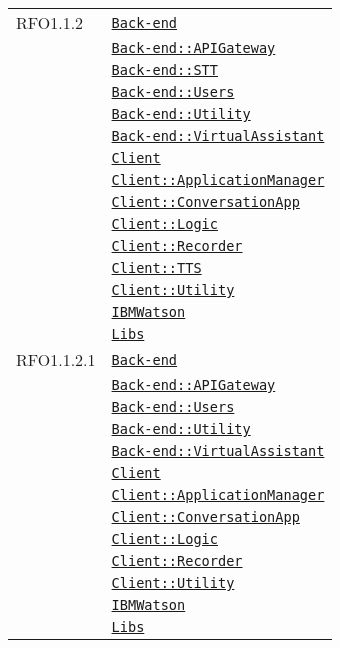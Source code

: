 \begin{longtable}{|>{\centering}m{3cm}|m{10cm}<{\centering}|}
RFO1.1.2 & \hyperref[Back-end]{\texttt{Back-end}}\\
& \hyperref[Back-end::APIGateway]{\texttt{Back-end::APIGateway}}\\
& \hyperref[Back-end::STT]{\texttt{Back-end::STT}}\\
& \hyperref[Back-end::Users]{\texttt{Back-end::Users}}\\
& \hyperref[Back-end::Utility]{\texttt{Back-end::Utility}}\\
& \hyperref[Back-end::VirtualAssistant]{\texttt{Back-end::VirtualAssistant}}\\
& \hyperref[Client]{\texttt{Client}}\\
& \hyperref[Client::ApplicationManager]{\texttt{Client::ApplicationManager}}\\
& \hyperref[Client::ConversationApp]{\texttt{Client::ConversationApp}}\\
& \hyperref[Client::Logic]{\texttt{Client::Logic}}\\
& \hyperref[Client::Recorder]{\texttt{Client::Recorder}}\\
& \hyperref[Client::TTS]{\texttt{Client::TTS}}\\
& \hyperref[Client::Utility]{\texttt{Client::Utility}}\\
& \hyperref[IBMWatson]{\texttt{IBMWatson}}\\
& \hyperref[Libs]{\texttt{Libs}}\\ \hline

RFO1.1.2.1 & \hyperref[Back-end]{\texttt{Back-end}}\\
& \hyperref[Back-end::APIGateway]{\texttt{Back-end::APIGateway}}\\
& \hyperref[Back-end::Users]{\texttt{Back-end::Users}}\\
& \hyperref[Back-end::Utility]{\texttt{Back-end::Utility}}\\
& \hyperref[Back-end::VirtualAssistant]{\texttt{Back-end::VirtualAssistant}}\\
& \hyperref[Client]{\texttt{Client}}\\
& \hyperref[Client::ApplicationManager]{\texttt{Client::ApplicationManager}}\\
& \hyperref[Client::ConversationApp]{\texttt{Client::ConversationApp}}\\
& \hyperref[Client::Logic]{\texttt{Client::Logic}}\\
& \hyperref[Client::Recorder]{\texttt{Client::Recorder}}\\
& \hyperref[Client::Utility]{\texttt{Client::Utility}}\\
& \hyperref[IBMWatson]{\texttt{IBMWatson}}\\
& \hyperref[Libs]{\texttt{Libs}}\\ \hline


\end{longtable}
